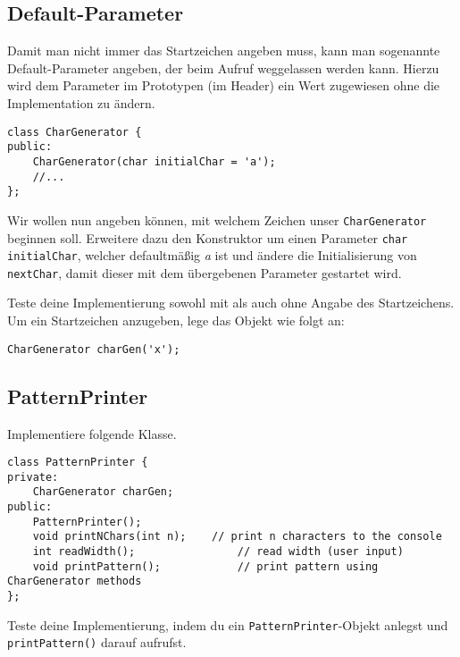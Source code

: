 
\subsection{Default-Parameter}
Damit man nicht immer das Startzeichen angeben muss, kann man sogenannte Default-Parameter angeben, der beim Aufruf weggelassen werden kann.
Hierzu wird dem Parameter im Prototypen (im Header) ein Wert zugewiesen ohne die Implementation zu ändern.
\begin{lstlisting}
class CharGenerator {
public:
	CharGenerator(char initialChar = 'a');
	//...
};
\end{lstlisting}

Wir wollen nun angeben können, mit welchem Zeichen unser \texttt{CharGenerator} beginnen soll.
Erweitere dazu den Konstruktor um einen Parameter \texttt{char initialChar}, welcher defaultmäßig \emph{a} ist und ändere die Initialisierung von \texttt{nextChar}, damit dieser mit dem übergebenen Parameter gestartet wird.

Teste deine Implementierung sowohl mit als auch ohne Angabe des Startzeichens.
Um ein Startzeichen anzugeben, lege das Objekt wie folgt an:
\begin{lstlisting}
CharGenerator charGen('x');
\end{lstlisting}


\subsection{PatternPrinter}
Implementiere folgende Klasse.
\begin{lstlisting}
class PatternPrinter {
private:
	CharGenerator charGen;
public:
	PatternPrinter();
	void printNChars(int n);	// print n characters to the console
	int readWidth();				// read width (user input)
	void printPattern();			// print pattern using CharGenerator methods
};
\end{lstlisting}

Teste deine Implementierung, indem du ein \texttt{PatternPrinter}-Objekt anlegst und \texttt{printPattern()} darauf aufrufst.

